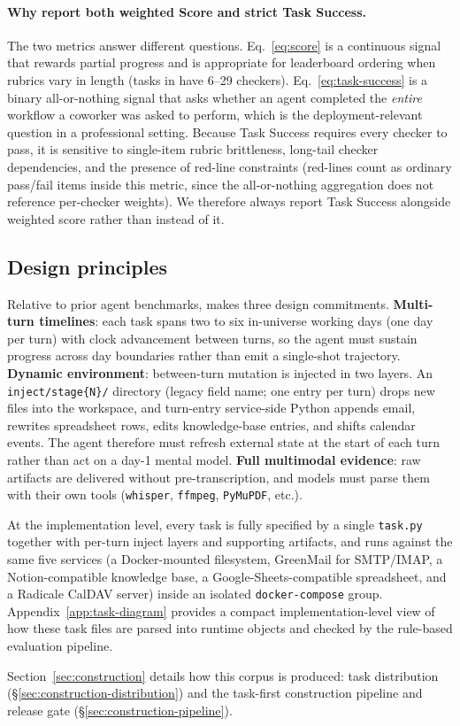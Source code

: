 \paragraph{Why report both weighted Score and strict Task Success.} The two metrics answer different questions. Eq.~\eqref{eq:score} is a continuous signal that rewards partial progress and is appropriate for leaderboard ordering when rubrics vary in length (tasks in \bench{} have 6--29 checkers). Eq.~\eqref{eq:task-success} is a binary all-or-nothing signal that asks whether an agent completed the \emph{entire} workflow a coworker was asked to perform, which is the deployment-relevant question in a professional setting. Because Task Success requires every checker to pass, it is sensitive to single-item rubric brittleness, long-tail checker dependencies, and the presence of red-line constraints (red-lines count as ordinary pass/fail items inside this metric, since the all-or-nothing aggregation does not reference per-checker weights). We therefore always report Task Success alongside weighted score rather than instead of it.

\subsection{Design principles}
\label{sec:design-principles}

Relative to prior agent benchmarks, \bench{} makes three design commitments. \textbf{Multi-turn timelines}: each task spans two to six in-universe working days (one day per turn) with clock advancement between turns, so the agent must sustain progress across day boundaries rather than emit a single-shot trajectory. \textbf{Dynamic environment}: between-turn mutation is injected in two layers. An \texttt{inject/stage\{N\}/} directory (legacy field name; one entry per turn) drops new files into the workspace, and turn-entry service-side Python appends email, rewrites spreadsheet rows, edits knowledge-base entries, and shifts calendar events. The agent therefore must refresh external state at the start of each turn rather than act on a day-1 mental model. \textbf{Full multimodal evidence}: raw artifacts are delivered without pre-transcription, and models must parse them with their own tools (\texttt{whisper}, \texttt{ffmpeg}, \texttt{PyMuPDF}, etc.).

At the implementation level, every task is fully specified by a single \texttt{task.py} together with per-turn inject layers and supporting artifacts, and runs against the same five services (a Docker-mounted filesystem, GreenMail for SMTP/IMAP, a Notion-compatible knowledge base, a Google-Sheets-compatible spreadsheet, and a Radicale CalDAV server) inside an isolated \texttt{docker-compose} group. Appendix~\ref{app:task-diagram} provides a compact implementation-level view of how these task files are parsed into runtime objects and checked by the rule-based evaluation pipeline.

Section~\ref{sec:construction} details how this corpus is produced: task distribution (\S\ref{sec:construction-distribution}) and the task-first construction pipeline and release gate (\S\ref{sec:construction-pipeline}).
